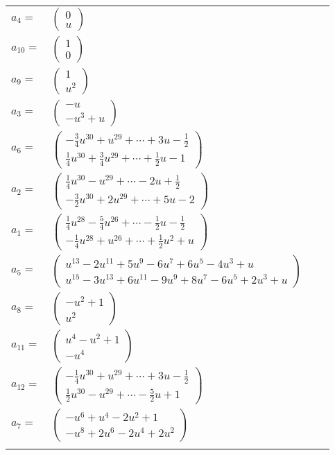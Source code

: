 \documentclass[1p]{elsarticle_modified}
\theoremstyle{definition}
\begin{document}
\begin{tabular}{m{7pt} m{180pt} m{7pt} m{180pt} }
\flushright $a_{4}=$&$\begin{pmatrix}0\\u\end{pmatrix}$ \\
\flushright $a_{10}=$&$\begin{pmatrix}1\\0\end{pmatrix}$ \\
\flushright $a_{9}=$&$\begin{pmatrix}1\\u^2\end{pmatrix}$ \\
\flushright $a_{3}=$&$\begin{pmatrix}- u\\- u^3+u\end{pmatrix}$ \\
\flushright $a_{6}=$&$\begin{pmatrix}-\frac{3}{4} u^{30}+u^{29}+\cdots+3 u-\frac{1}{2}\\\frac{1}{4} u^{30}+\frac{3}{4} u^{29}+\cdots+\frac{1}{2} u-1\end{pmatrix}$ \\
\flushright $a_{2}=$&$\begin{pmatrix}\frac{1}{4} u^{30}- u^{29}+\cdots-2 u+\frac{1}{2}\\-\frac{3}{2} u^{30}+2 u^{29}+\cdots+5 u-2\end{pmatrix}$ \\
\flushright $a_{1}=$&$\begin{pmatrix}\frac{1}{4} u^{28}-\frac{5}{4} u^{26}+\cdots-\frac{1}{2} u-\frac{1}{2}\\-\frac{1}{4} u^{28}+u^{26}+\cdots+\frac{1}{2} u^2+u\end{pmatrix}$ \\
\flushright $a_{5}=$&$\begin{pmatrix}u^{13}-2 u^{11}+5 u^9-6 u^7+6 u^5-4 u^3+u\\u^{15}-3 u^{13}+6 u^{11}-9 u^9+8 u^7-6 u^5+2 u^3+u\end{pmatrix}$ \\
\flushright $a_{8}=$&$\begin{pmatrix}- u^2+1\\u^2\end{pmatrix}$ \\
\flushright $a_{11}=$&$\begin{pmatrix}u^4- u^2+1\\- u^4\end{pmatrix}$ \\
\flushright $a_{12}=$&$\begin{pmatrix}-\frac{1}{4} u^{30}+u^{29}+\cdots+3 u-\frac{1}{2}\\\frac{1}{2} u^{30}- u^{29}+\cdots-\frac{5}{2} u+1\end{pmatrix}$ \\
\flushright $a_{7}=$&$\begin{pmatrix}- u^6+u^4-2 u^2+1\\- u^8+2 u^6-2 u^4+2 u^2\end{pmatrix}$\\&\end{tabular}
\end{document}

